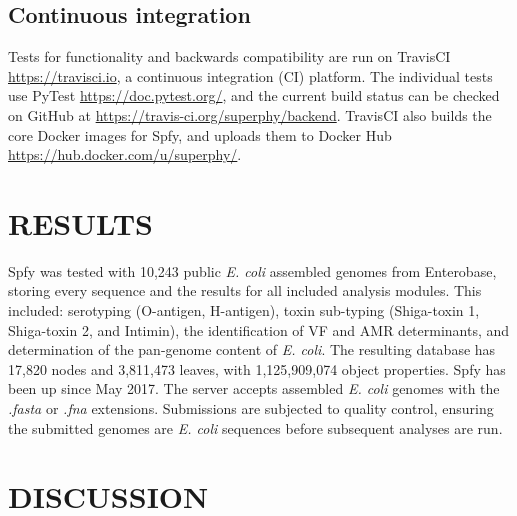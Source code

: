 \documentclass{article}
\begin{document}
\subsection{Continuous integration}

Tests for functionality and backwards compatibility are run on TravisCI \url{https://travisci.io}, a continuous integration (CI) platform.
The individual tests use PyTest \url{https://doc.pytest.org/}, and the current build status can be checked on GitHub at \url{https://travis-ci.org/superphy/backend}.
TravisCI also builds the core Docker images for Spfy, and uploads them to Docker Hub \url{https://hub.docker.com/u/superphy/}.

\section{RESULTS}
Spfy was tested with 10,243 public \textit{E. coli} assembled genomes from Enterobase, storing every sequence and the results for all included analysis modules. This included: serotyping (O-antigen, H-antigen), toxin sub-typing (Shiga-toxin 1, Shiga-toxin 2, and Intimin), the identification of VF and AMR determinants, and determination of the pan-genome content of \textit{E. coli}.
The resulting database has 17,820 nodes and 3,811,473 leaves, with 1,125,909,074 object properties.
Spfy has been up since May 2017. The server accepts assembled \textit{E. coli} genomes with the \textit{.fasta} or \textit{.fna} extensions. Submissions are subjected to quality control, ensuring the submitted genomes are \textit{E. coli} sequences before subsequent analyses are run.
\par



\section{DISCUSSION}
\end{document}
